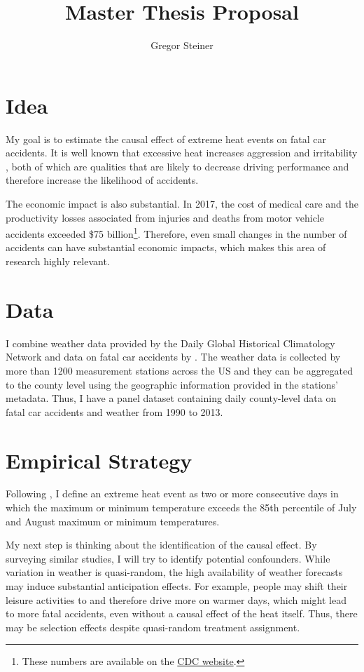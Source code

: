 \documentclass[11pt]{article}
\author{Gregor Steiner}
\title{Master Thesis Proposal}
\begin{document}
\maketitle

\section*{Idea}

My goal is to estimate the causal effect of extreme heat events on fatal car accidents. It is well known that excessive heat increases aggression and irritability \citep{anderson2011implications}, both of which are qualities that are likely to decrease driving performance and therefore increase the likelihood of accidents.

The economic impact is also substantial. In 2017, the cost of medical care and the productivity losses associated from injuries and deaths from motor vehicle accidents exceeded \$75 billion\footnote{These numbers are available on the \href{https://www.cdc.gov/transportationsafety/costs/index.html}{CDC website}.}. Therefore, even small changes in the number of accidents can have substantial economic impacts, which makes this area of research highly relevant.

\section*{Data}

I combine weather data provided by the Daily Global Historical Climatology Network \citep{Menne_2012} and data on fatal car accidents by \citet{Smith_2016}. The weather data is collected by more than 1200 measurement stations across the US and they can be aggregated to the county level using the geographic information provided in the stations' metadata. Thus, I have a panel dataset containing daily county-level data on fatal car accidents and weather from 1990 to 2013.

\section*{Empirical Strategy}

Following \citet{Habeeb_2015}, I define an extreme heat event as two or more
consecutive days in which the maximum or minimum temperature exceeds the 85th percentile of July and August maximum or minimum temperatures. 

My next step is thinking about the identification of the causal effect. By surveying similar studies, I will try to identify potential confounders. While variation in weather is quasi-random, the high availability of weather forecasts may induce substantial anticipation effects. For example, people may shift their leisure activities to and therefore drive more on warmer days, which might lead to more fatal accidents, even without a causal effect of the heat itself. Thus, there may be selection effects despite quasi-random treatment assignment.
\end{document}
